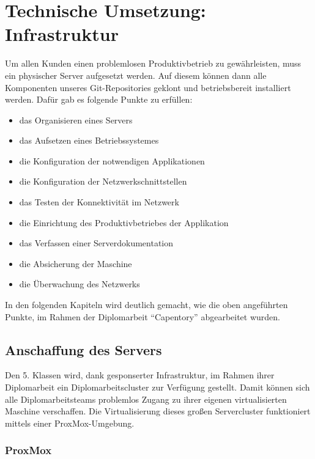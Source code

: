 \hypertarget{technische-umsetzung-infrastruktur}{%
\section{Technische Umsetzung:
Infrastruktur}\label{technische-umsetzung-infrastruktur}}

Um allen Kunden einen problemlosen Produktivbetrieb zu gewährleisten,
muss ein physischer Server aufgesetzt werden. Auf diesem können dann
alle Komponenten unseres Git-Repositories geklont und betriebsbereit
installiert werden. Dafür gab es folgende Punkte zu erfüllen:

\begin{itemize}
\tightlist
\item
  das Organisieren eines Servers
\item
  das Aufsetzen eines Betriebssystemes
\item
  die Konfiguration der notwendigen Applikationen
\item
  die Konfiguration der Netzwerkschnittstellen
\item
  das Testen der Konnektivität im Netzwerk
\item
  die Einrichtung des Produktivbetriebes der Applikation
\item
  das Verfassen einer Serverdokumentation
\item
  die Absicherung der Maschine
\item
  die Überwachung des Netzwerks
\end{itemize}

In den folgenden Kapiteln wird deutlich gemacht, wie die oben
angeführten Punkte, im Rahmen der Diplomarbeit ``Capentory''
abgearbeitet wurden.

\hypertarget{anschaffung-des-servers}{%
\subsection{Anschaffung des Servers}\label{anschaffung-des-servers}}

Den 5. Klassen wird, dank gesponserter Infrastruktur, im Rahmen ihrer
Diplomarbeit ein Diplomarbeitscluster zur Verfügung gestellt. Damit
können sich alle Diplomarbeitsteams problemlos Zugang zu ihrer eigenen
virtualisierten Maschine verschaffen. Die Virtualisierung dieses großen
Servercluster funktioniert mittels einer ProxMox-Umgebung.

\hypertarget{proxmox}{%
\subsubsection{ProxMox}\label{proxmox}}

